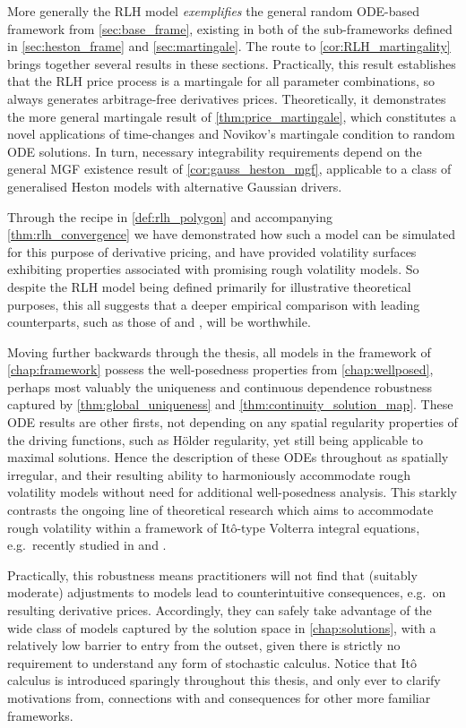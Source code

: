 More generally the RLH model \emph{exemplifies} the general random ODE-based framework from \autoref{sec:base_frame}, existing in both of the sub-frameworks defined in \autoref{sec:heston_frame} and \autoref{sec:martingale}. The route to \autoref{cor:RLH_martingality} brings together several results in these sections. Practically, this result establishes that the RLH price process is a martingale for all parameter combinations, so always generates arbitrage-free derivatives prices. Theoretically, it demonstrates the more general martingale result of  \autoref{thm:price_martingale}, which constitutes a novel applications of time-changes and Novikov's martingale condition to random ODE solutions. In turn, necessary integrability requirements depend on the general MGF existence result of \autoref{cor:gauss_heston_mgf}, applicable to a class of generalised Heston models with alternative Gaussian drivers.

Through the recipe in \autoref{def:rlh_polygon} and accompanying \autoref{thm:rlh_convergence} we have demonstrated how such a model can be simulated for this purpose of derivative pricing, and have provided volatility surfaces exhibiting properties associated with promising rough volatility models. So despite the RLH model being defined primarily for illustrative theoretical purposes, this all suggests that a deeper empirical comparison with leading counterparts, such as those of \cite{bayer_2016} and \cite{eleuch_2019a}, will be worthwhile.

Moving further backwards through the thesis, all models in the framework of \autoref{chap:framework} possess the well-posedness properties from \autoref{chap:wellposed}, perhaps most valuably the uniqueness and continuous dependence robustness captured by \autoref{thm:global_uniqueness} and \autoref{thm:continuity_solution_map}. These ODE results are other firsts, not depending on any spatial regularity properties of the driving functions, such as H\"older regularity, yet still being applicable to maximal solutions. Hence the description of these ODEs throughout as spatially irregular, and their resulting ability to harmoniously accommodate rough volatility models without need for additional well-posedness analysis. This starkly contrasts the ongoing line of theoretical research which aims to accommodate rough volatility within a framework of It\^o-type Volterra integral equations, e.g.~recently studied in \cite{keller-ressel_2018} and \cite{abijaber_2019c}.

Practically, this robustness means practitioners will not find that (suitably moderate) adjustments to models lead to counterintuitive consequences, e.g.~on resulting derivative prices. Accordingly, they can safely take advantage of the wide class of models captured by the solution space in \autoref{chap:solutions}, with a relatively low barrier to entry from the outset, given there is strictly no requirement to understand any form of stochastic calculus. Notice that It\^o calculus is introduced sparingly throughout this thesis, and only ever to clarify motivations from, connections with and consequences for other more familiar frameworks.

